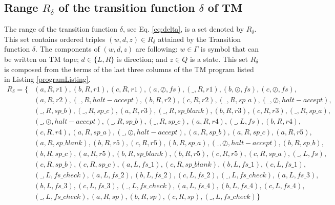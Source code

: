 \documentclass[12pt, a4paper]{report}
\begin{document}
	\subsection{Range $ R_{\delta} $ of the transition function $ \delta $ of TM}
	The range of the transition function $ \delta $, see Eq. \ref{eq:delta}, is a set denoted by $ R_{\delta} $. This set contains ordered triples $ (w, d, z) \in R_{\delta} $ attained by the Transition function $ \delta $. The components of $ (w, d, z) $ are following: $ w \in \Gamma $ is symbol that can be written on TM tape; $ d \in \{L, R\} $ is direction; and $ z \in Q $ is a state.
	This set $ R_{\delta} $ is composed from the terms of the last three columns of the TM program listed in Listing \ref{programListing}.
	\begin{equation}
	\label{eq:range}
	\begin{aligned}
	R_{\delta} = \{
		& (a, R, r1), (b, R, r1), (c, R, r1), (a, \oslash, fs), (\_, R, r1), (b, \oslash, fs), (c, \oslash, fs), \\
		& (a, R, r2), (\_, R, halt-accept), (b, R, r2), (c, R, r2), (\_, R, sp\_a), (\_, \oslash, halt-accept), \\
		& (\_, R, sp\_b), (\_, R, sp\_c), (a, R, r3), (\_, R, sp\_blank), (b, R, r3), (c, R, r3), (\_, R, sp\_a), \\
		& (\_, \oslash, halt-accept), (\_, R, sp\_b), (\_, R, sp\_c), (a, R, r4), (\_, L, fs), (b, R, r4), \\
		& (c, R, r4), (a, R, sp\_a), (\_, \oslash, halt-accept), (a, R, sp\_b), (a, R, sp\_c), (a, R, r5), \\
		& (a, R, sp\_blank), (b, R, r5), (c, R, r5), (b, R, sp\_a), (\_, \oslash, halt-accept), (b, R, sp\_b),\\
		& (b, R, sp\_c), (a, R, r5), (b, R, sp\_blank), (b, R, r5), (c, R, r5), (c, R, sp\_a), (\_, L, fs), \\
		& (c, R, sp\_b), (c, R, sp\_c), (a, L, fs\_1), (c, R, sp\_blank), (b, L, fs\_1), (c, L, fs\_1), \\
		& (\_, L, fs\_check), (a, L, fs\_2), (b, L, fs\_2), (c, L, fs\_2), (\_, L, fs\_check), (a, L, fs\_3), \\
		& (b, L, fs\_3), (c, L, fs\_3), (\_, L, fs\_check), (a, L, fs\_4), (b, L, fs\_4), (c, L, fs\_4), \\
		& (\_, L, fs\_check), (a, R, sp), (b, R, sp), (c, R, sp), (\_, L, fs\_check) \}
	\end{aligned}
	\end{equation}
	
\end{document}
